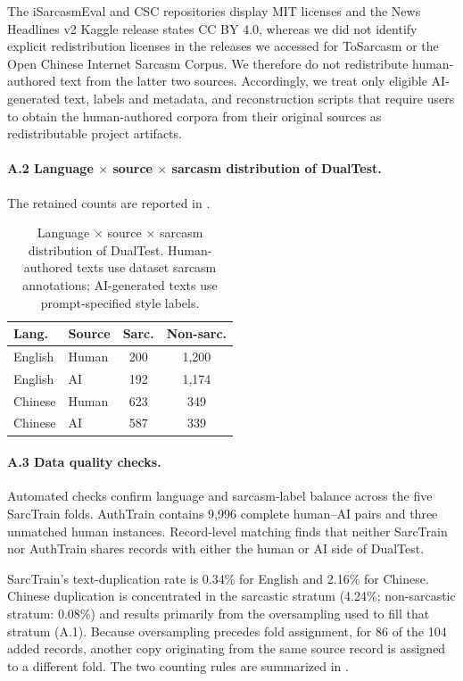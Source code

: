 The iSarcasmEval and CSC repositories display MIT licenses and the News Headlines v2 Kaggle release states CC BY 4.0, whereas we did not identify explicit redistribution licenses in the releases we accessed for ToSarcasm or the Open Chinese Internet Sarcasm Corpus. We therefore do not redistribute human-authored text from the latter two sources. Accordingly, we treat only eligible AI-generated text, labels and metadata, and reconstruction scripts that require users to obtain the human-authored corpora from their original sources as redistributable project artifacts.

\paragraph{A.2 Language $\times$ source $\times$ sarcasm distribution of DualTest.} The retained counts are reported in .

\begin{table}[H]
  \centering
  \small
  \begin{tabular}{@{}llcc@{}}
    \toprule
    \textbf{Lang.} & \textbf{Source} & \textbf{Sarc.} & \textbf{Non-sarc.} \\
    \midrule
    English & Human & 200 & 1{,}200 \\
    English & AI & 192 & 1{,}174 \\
    Chinese & Human & 623 & 349 \\
    Chinese & AI & 587 & 339 \\
    \bottomrule
  \end{tabular}
  \caption{Language $\times$ source $\times$ sarcasm distribution of DualTest. Human-authored texts use dataset sarcasm annotations; AI-generated texts use prompt-specified style labels.}
  \label{tab:dualtest-dist}
\end{table}

\paragraph{A.3 Data quality checks.} Automated checks confirm language and sarcasm-label balance across the five SarcTrain folds. AuthTrain contains 9{,}996 complete human--AI pairs and three unmatched human instances. Record-level matching finds that neither SarcTrain nor AuthTrain shares records with either the human or AI side of DualTest.

SarcTrain's text-duplication rate is 0.34\% for English and 2.16\% for Chinese. Chinese duplication is concentrated in the sarcastic stratum (4.24\%; non-sarcastic stratum: 0.08\%) and results primarily from the oversampling used to fill that stratum (A.1). Because oversampling precedes fold assignment, for 86 of the 104 added records, another copy originating from the same source record is assigned to a different fold. The two counting rules are summarized in .

